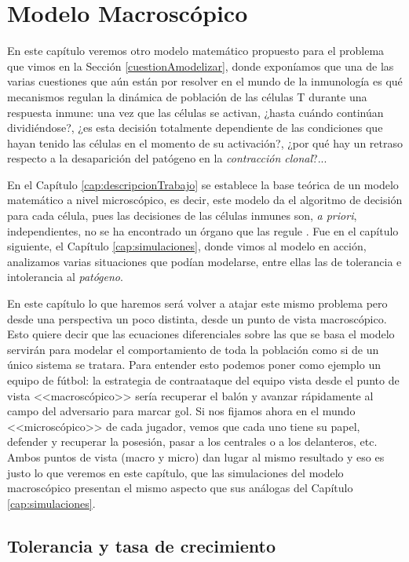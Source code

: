
\chapter{Modelo Macroscópico}
\label{cap:modeloMacroscopico}

En este capítulo veremos otro modelo matemático propuesto para el problema que vimos en la Sección \ref{cuestionAmodelizar}, donde exponíamos que una de las varias cuestiones que aún están por resolver en el mundo de la inmunología es qué mecanismos regulan la dinámica de población de las células T durante una respuesta inmune: una vez que las células se activan, ¿hasta cuándo continúan dividiéndose?, ¿es esta decisión totalmente dependiente de las condiciones que hayan tenido las células en el momento de su activación?, ¿por qué hay un retraso respecto a la desaparición del patógeno en la \textit{contracción clonal}?... 

En el Capítulo \ref{cap:descripcionTrabajo} se establece la base teórica de un modelo matemático a nivel microscópico, es decir, este modelo da el algoritmo de decisión para cada célula, pues las decisiones de las células inmunes son, \textit{a priori}, independientes, no se ha encontrado un órgano que las regule \citep{arias2016emergent}. Fue en el capítulo siguiente, el Capítulo \ref{cap:simulaciones}, donde vimos al modelo en acción, analizamos varias situaciones que podían modelarse, entre ellas las de tolerancia e intolerancia al \textit{patógeno}.

En este capítulo lo que haremos será volver a atajar este mismo problema pero desde una perspectiva un poco distinta, desde un punto de vista macroscópico. Esto quiere decir que las ecuaciones diferenciales sobre las que se basa el modelo servirán para modelar el comportamiento de toda la población como si de un único sistema se tratara. Para entender esto podemos poner como ejemplo un equipo de fútbol: la estrategia de contraataque del equipo vista desde el punto de vista <<macroscópico>> sería recuperar el balón y avanzar rápidamente al campo del adversario para marcar gol. Si nos fijamos ahora en el mundo <<microscópico>> de cada jugador, vemos que cada uno tiene su papel, defender y recuperar la posesión, pasar a los centrales o a los delanteros, etc. Ambos puntos de vista (macro y micro) dan lugar al mismo resultado y eso es justo lo que veremos en este capítulo, que las simulaciones del modelo macroscópico presentan el mismo aspecto que sus análogas del Capítulo \ref{cap:simulaciones}.

\section{Tolerancia y tasa de crecimiento}

